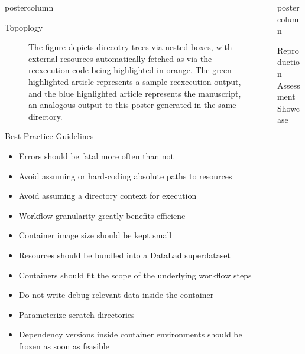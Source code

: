 \begin{frame}
\begin{columns}
\begin{column}{.42\textwidth}
\begin{beamercolorbox}[center]{postercolumn}
\begin{minipage}{.98\textwidth}
{\begin{myblock}{Topoplogy}
\begin{figure}
{								The figure depicts direcotry trees via nested boxes, with external resources automatically fetched as via the reexecution code being highlighted in orange.
								The green highlighted article represents a sample reexecution output, and the blue hignlighted article represents the manuscript, an analogous output to this poster generated in the same directory.
							}
						\end{figure}
					\end{myblock}\vfill
					\begin{myblock}{Best Practice Guidelines}
						\vspace{0.5em}
						\Large
						\begin{itemize}
							\item Errors should be fatal more often than not
							\item Avoid assuming or hard-coding absolute paths to resources
							\item Avoid assuming a directory context for execution
							\item Workflow granularity greatly benefits efficienc
							\item Container image size should be kept small
							\item Resources should be bundled into a DataLad superdataset
							\item Containers should fit the scope of the underlying workflow steps
							\item Do not write debug-relevant data inside the container
							\item Parameterize scratch directories
							\item Dependency versions inside container environments should be frozen as soon as feasible
						\end{itemize}
					\end{myblock}\vfill
		}\end{minipage}\end{beamercolorbox}
	\end{column}
	\begin{column}{.59\textwidth}
		\begin{beamercolorbox}[center]{postercolumn}
			\begin{minipage}{.98\textwidth} %
				\parbox[t][\columnheight]{\textwidth}{ %
					\begin{myblock}{Reproduction Assessment Showcase}
						\vspace{-0.45em}

\end{myblock}}
\end{minipage}
\end{beamercolorbox}
\end{column}
\end{columns}
\end{frame}
